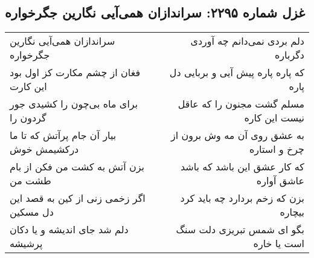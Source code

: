 \begin{center}
\section*{غزل شماره ۲۲۹۵: سراندازان همی‌آیی نگارین جگرخواره}
\label{sec:2295}
\begin{longtable}{l p{0.5cm} r}
سراندازان همی‌آیی نگارین جگرخواره
&&
دلم بردی نمی‌دانم چه آوردی دگرباره
\\
فغان از چشم مکارت کز اول بود این کارت
&&
که پاره پاره پیش آیی و بربایی دل پاره
\\
برای ماه بی‌چون را کشیدی جور گردون را
&&
مسلم گشت مجنون را که عاقل نیست این کاره
\\
بیار آن جام پرآتش که تا ما درکشیمش خوش
&&
به عشق روی آن مه وش برون از چرخ و استاره
\\
بزن آتش به کشت من فکن از بام طشت من
&&
که کار عشق این باشد که باشد عاشق آواره
\\
اگر زخمی زنی از کین به قصد این دل مسکین
&&
بزن که زخم بردارد چه باید کرد بیچاره
\\
دلم شد جای اندیشه و یا دکان پرشیشه
&&
بگو ای شمس تبریزی دلت سنگ است یا خاره
\\
\end{longtable}
\end{center}
